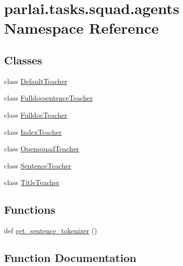 \hypertarget{namespaceparlai_1_1tasks_1_1squad_1_1agents}{}\section{parlai.\+tasks.\+squad.\+agents Namespace Reference}
\label{namespaceparlai_1_1tasks_1_1squad_1_1agents}
\subsection*{Classes}
\begin{DoxyCompactItemize}
\item 
class \hyperlink{classparlai_1_1tasks_1_1squad_1_1agents_1_1DefaultTeacher}{Default\+Teacher}
\item 
class \hyperlink{classparlai_1_1tasks_1_1squad_1_1agents_1_1FulldocsentenceTeacher}{Fulldocsentence\+Teacher}
\item 
class \hyperlink{classparlai_1_1tasks_1_1squad_1_1agents_1_1FulldocTeacher}{Fulldoc\+Teacher}
\item 
class \hyperlink{classparlai_1_1tasks_1_1squad_1_1agents_1_1IndexTeacher}{Index\+Teacher}
\item 
class \hyperlink{classparlai_1_1tasks_1_1squad_1_1agents_1_1OpensquadTeacher}{Opensquad\+Teacher}
\item 
class \hyperlink{classparlai_1_1tasks_1_1squad_1_1agents_1_1SentenceTeacher}{Sentence\+Teacher}
\item 
class \hyperlink{classparlai_1_1tasks_1_1squad_1_1agents_1_1TitleTeacher}{Title\+Teacher}
\end{DoxyCompactItemize}
\subsection*{Functions}
\begin{DoxyCompactItemize}
\item 
def \hyperlink{namespaceparlai_1_1tasks_1_1squad_1_1agents_aedb3f218a9f6d84f322f3b17372bd047}{get\+\_\+sentence\+\_\+tokenizer} ()
\end{DoxyCompactItemize}


\subsection{Function Documentation}
\mbox{\label{namespaceparlai_1_1tasks_1_1squad_1_1agents_aedb3f218a9f6d84f322f3b17372bd047}} 
